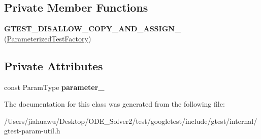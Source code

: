 \subsection*{Private Member Functions}
\begin{DoxyCompactItemize}
\item 
\mbox{\label{classtesting_1_1internal_1_1_parameterized_test_factory_ac70e70bd61d0f66bbc68ed2587c42d92}} 
{\bfseries G\+T\+E\+S\+T\+\_\+\+D\+I\+S\+A\+L\+L\+O\+W\+\_\+\+C\+O\+P\+Y\+\_\+\+A\+N\+D\+\_\+\+A\+S\+S\+I\+G\+N\+\_\+} (\mbox{\hyperlink{classtesting_1_1internal_1_1_parameterized_test_factory}{Parameterized\+Test\+Factory}})
\end{DoxyCompactItemize}
\subsection*{Private Attributes}
\begin{DoxyCompactItemize}
\item 
\mbox{\label{classtesting_1_1internal_1_1_parameterized_test_factory_a9ee3e72cb3b169924b5328009ed48b5e}} 
const Param\+Type {\bfseries parameter\+\_\+}
\end{DoxyCompactItemize}


The documentation for this class was generated from the following file\+:\begin{DoxyCompactItemize}
\item 
/\+Users/jiahuawu/\+Desktop/\+O\+D\+E\+\_\+\+Solver2/test/googletest/include/gtest/internal/gtest-\/param-\/util.\+h\end{DoxyCompactItemize}

